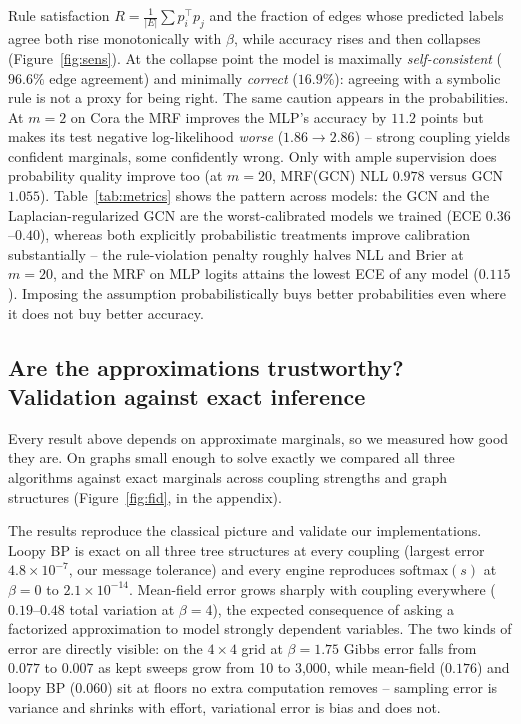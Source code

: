 \documentclass{article}
\begin{document}
Rule satisfaction $R=\frac{1}{|E|}\sum p_i^\top p_j$ and the fraction of edges whose predicted
labels agree both rise monotonically with $\beta$, while accuracy rises and then collapses
(Figure~\ref{fig:sens}). At the collapse point the model is maximally \emph{self-consistent}
($96.6\%$ edge agreement) and minimally \emph{correct} ($16.9\%$): agreeing with a symbolic rule
is not a proxy for being right. The same caution appears in the probabilities. At $m{=}2$ on Cora
the MRF improves the MLP's accuracy by $11.2$ points but makes its test negative log-likelihood
\emph{worse} ($1.86\to2.86$) -- strong coupling yields confident marginals, some confidently
wrong. Only with ample supervision does probability quality improve too (at $m{=}20$, MRF(GCN)
NLL $0.978$ versus GCN $1.055$). Table~\ref{tab:metrics} shows the pattern across models: the
GCN and the Laplacian-regularized GCN are the worst-calibrated models we trained
(ECE $0.36$--$0.40$), whereas both explicitly probabilistic treatments improve calibration
substantially -- the rule-violation penalty roughly halves NLL and Brier at $m{=}20$, and the MRF
on MLP logits attains the lowest ECE of any model ($0.115$). Imposing the assumption
probabilistically buys better probabilities even where it does not buy better accuracy.

\subsection{Are the approximations trustworthy? Validation against exact inference}
\label{sec:fid}

Every result above depends on approximate marginals, so we measured how good they are. On graphs
small enough to solve exactly we compared all three algorithms against exact marginals across
coupling strengths and graph structures (Figure~\ref{fig:fid}, in the appendix).

The results reproduce the classical picture \citep{murphy1999loopy} and validate our
implementations. Loopy BP is exact on all three tree structures at every coupling (largest error
$4.8\times10^{-7}$, our message tolerance) and every engine reproduces $\mathrm{softmax}(s)$ at
$\beta=0$ to $2.1\times10^{-14}$. Mean-field error grows sharply with coupling everywhere
($0.19$--$0.48$ total variation at $\beta=4$), the expected consequence of asking a factorized
approximation to model strongly dependent variables. The two kinds of error are directly visible:
on the $4\times4$ grid at $\beta=1.75$ Gibbs error falls from $0.077$ to $0.007$ as kept sweeps
grow from 10 to 3{,}000, while mean-field ($0.176$) and loopy BP ($0.060$) sit at floors no extra
computation removes -- sampling error is variance and shrinks with effort, variational error is
bias and does not.
\end{document}
